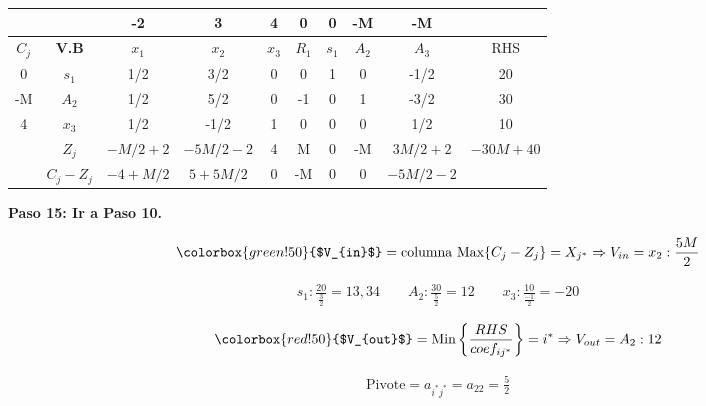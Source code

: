 \documentclass{templateNote}
\begin{document}
\begin{center}
    \begin{tabular}{|c|c|c|c|c|c|c|c|c|c|}
        \hline
        & & -2 & 3 & 4 & 0 & 0 & -M & -M & \\ \hline
        $C_j$ & \textbf{V.B} & $x_1$ & $x_2$ & $x_3$ & $R_1$ & $s_1$ & $A_2$ & $A_3$ & RHS \\ \hline
        0 & $s_1$ & 1/2 & 3/2 & 0 & 0 & 1 & 0 & -1/2 & 20 \\ \hline
        -M & $A_2$ & 1/2 & 5/2 & 0 & -1 & 0 & 1 & -3/2 & 30 \\ \hline
        4 & $x_3$ & 1/2 & -1/2 & 1 & 0 & 0 & 0 & 1/2 & 10 \\ \hline
        & $Z_j$ & $-M/2 + 2$ & $-5M/2 - 2$ & 4 & M & 0 & -M & $3M/2 + 2$ & \underline{$-30M + 40$} \\ \hline
        & $C_j - Z_j$ & $-4 +M/2$ & $5+5M/2$ & 0 & -M & 0 & 0 & $-5M/2 -2$ & \\ \hline
    \end{tabular}
\end{center}
\newpage
\textbf{Paso 15: Ir a Paso 10.}
\begin{center}
    \begin{equation*}
        \colorbox{green!50}{$V_{in}$} = \text{columna Max} \{C_j-Z_j\} = X_{j^*} \Rightarrow V_{in} = x_2 : \frac{5M}{2} 
    \end{equation*}
\end{center}
\begin{align*}
    s_1: \frac{20}{\frac{3}{2}} = 13,34 \qquad A_2: \frac{30}{\frac{5}{2}} = 12 \qquad x_3: \frac{10}{\frac{-1}{2}} = -20
\end{align*}
\begin{center}
    \begin{equation*}
        \colorbox{red!50}{$V_{out}$} = \text{Min} \left\{ \frac{RHS}{coef_{ij^*}} \right\} = i^* \Rightarrow V_{out} = A_2 : 12
    \end{equation*}
\end{center}
\begin{equation*}
    \begin{aligned}
        \text{Pivote} = a_{i^*j^*} = a_{22} = \frac{5}{2}
    \end{aligned}
\end{equation*}
\end{document}
